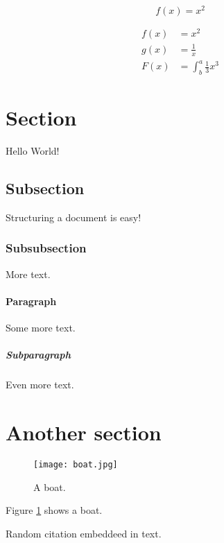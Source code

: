 \documentclass{article}
\begin{document}
\begin{equation*}
  f(x) = x^2
\end{equation*}

\begin{align*}
  f(x) &= x^2\\
  g(x) &= \frac{1}{x}\\
  F(x) &= \int^a_b \frac{1}{3}x^3
\end{align*}

\section{Section}

Hello World!

\subsection{Subsection}

Structuring a document is easy!

\subsubsection{Subsubsection}

More text.

\paragraph{Paragraph}

Some more text.

\subparagraph{Subparagraph}

Even more text.

\section{Another section}

\begin{figure}
  \texttt{[image: boat.jpg]}
  \caption{A boat.}
  \label{fig:boat1}
\end{figure}

Figure \ref{fig:boat1} shows a boat.

\newpage




Random citation \autocite[1]{DUMMY:1} embeddeed in text.

\newpage

\printbibliography
\end{document}
